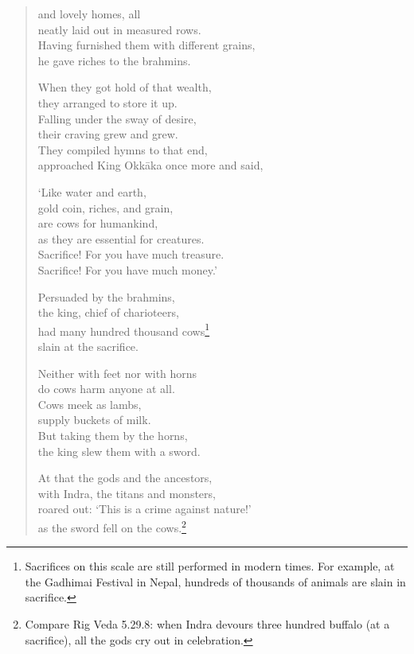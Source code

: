 \documentclass[12pt,openany]{book}%
\begin{document}
\begin{verse}
and lovely homes, all \\
neatly laid out in measured rows. \\
Having furnished them with different grains, \\
he gave riches to the brahmins. 

When they got hold of that wealth, \\
they arranged to store it up. \\
Falling under the sway of desire, \\
their craving grew and grew. \\
They compiled hymns to that end, \\
approached King \textsanskrit{Okkāka} once more and said, 

‘Like water and earth, \\
gold coin, riches, and grain, \\
are cows for humankind, \\
as they are essential for creatures. \\
Sacrifice! For you have much treasure. \\
Sacrifice! For you have much money.’ 

Persuaded by the brahmins, \\
the king, chief of charioteers, \\
had many hundred thousand cows\footnote{Sacrifices on this scale are still performed in modern times. For example, at the Gadhimai Festival in Nepal, hundreds of thousands of animals are slain in sacrifice. } \\
slain at the sacrifice. 

Neither with feet nor with horns \\
do cows harm anyone at all. \\
Cows meek as lambs, \\
supply buckets of milk. \\
But taking them by the horns, \\
the king slew them with a sword. 

At that the gods and the ancestors, \\
with Indra, the titans and monsters, \\
roared out: ‘This is a crime against nature!’ \\
as the sword fell on the cows.\footnote{Compare Rig Veda 5.29.8: when Indra devours three hundred buffalo (at a sacrifice), all the gods cry out in celebration. } 


\end{verse}
\end{document}
